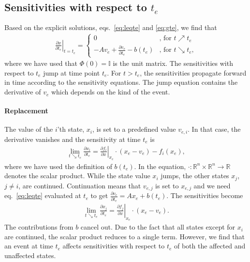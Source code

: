 \documentclass[journal, a4paper]{IEEEtran}
\begin{document}
\subsection{Sensitivities with respect to $t_e$}
Based on the explicit solutions, eqs.~\eqref{eq:leqte} and \eqref{eq:gte}, we find that
\begin{align}
    \left.\frac{\partial x}{\partial t_e}\right|_{t = t_e} =
    \left\{
    \begin{array}{ll}
    0     & \textrm{, for } t\nearrow t_e \\
    -A v_e + \frac{\partial v_e}{\partial t_e} - b(t_e)     & \textrm{, for }t \searrow t_e,
    \end{array}
    \right.
    \label{eq:jump}
\end{align}
where we have used that $\Phi(0) = \mathbb I$ is the unit matrix. The sensitivities with respect to $t_e$ jump at time point $t_e$. For $t > t_e$, the sensitivities propagate forward in time according to the sensitivity equations. The jump equation contains the derivative of $v_e$ which depends on the kind of the event.\\

\paragraph{Replacement}
The value of the $i$'th state, $x_i$, is set to a predefined value $v_{e, i}$. In that case, the derivative vanishes and the sensitivity at time $t_e$ is
\begin{align}
    \lim_{t\searrow t_e}\frac{\partial x_i}{\partial t_e} = \left.\frac{\partial f_i}{\partial x}\right|_{x_e}\cdot (x_e - v_e) - f_i(x_e),
    \label{eq:replace}
\end{align}
where we have used the definition of $b(t_e)$. In the equation, $\cdot: \mathbb R^n\times \mathbb R^n\rightarrow \mathbb R$ denotes the scalar product. While the state value $x_i$ jumps, the other states $x_j$, $j\neq i$, are continued. Continuation means that $v_{e, j}$ is set to $x_{e, j}$ and we need eq.~\eqref{eq:leqte} evaluated at $t_e$ to get $\frac{\partial v_e}{\partial t_e} = Ax_e + b(t_e)$. The sensitivities become
\begin{align}
    \lim_{t\searrow t_e}\frac{\partial x_j}{\partial t_e} = \left.\frac{\partial f_j}{\partial x}\right|_{x_e}\cdot (x_e - v_e).\label{eq:continued}
\end{align}
The contributions from $b$ cancel out. Due to the fact that all states except for $x_i$ are continued, the scalar product reduces to a single term. However, we find that an event at time $t_e$ affects sensitivities with respect to $t_e$ of both the affected and unaffected states.\\
\end{document}
